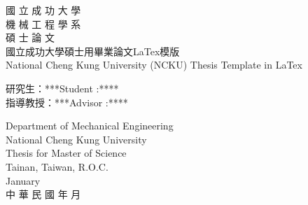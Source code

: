 {\Large
	\begin{center}
		\vspace*{0.1 cm}
		國 立 成 功 大 學\\
		\vspace{0.3 cm}
		機 械 工 程 學 系\\
		\vspace{0.3 cm}
		碩 士 論 文\\
		\vspace{2.5 cm}
		國立成功大學碩士用畢業論文LaTex模版\\
		\vspace{2.3 cm}
		National Cheng Kung University (NCKU) Thesis Template in LaTex\\
		\vspace{2.3 cm}
	\end{center}
	\-\hspace{2cm}研\hspace{0.3 cm}究\hspace{0.3 cm}生：***\hspace{0.8 cm}Student :**** \\
	\-\hspace{2cm}指導教授：***\hspace{0.8 cm}Advisor :**** \\
	\begin{center}
		\vspace{1.5 cm}
		Department of Mechanical Engineering\\	
		National Cheng Kung University\\	
		Thesis for Master of Science\\	
		Tainan, Taiwan, R.O.C.\\	
		January \space \the\year\\
		\vspace{1.5 cm}
		中 華 民 國 \Minguo 年 \the\month 月 %
	\end{center}
}

